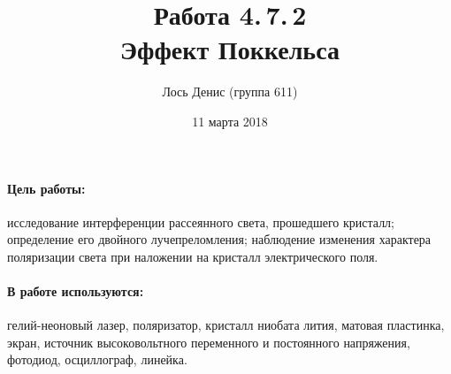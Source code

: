 \documentclass[12pt]{article}
\title{{\bf Работа 4.\,7.\,2 \\ Эффект Поккельса}}
\author{Лось Денис (группа 611)}
\date{11 марта 2018}
\begin{document}
\maketitle

\paragraph{Цель работы: } исследование интерференции рассеянного света, прошедшего кристалл; определение его двойного лучепреломления; наблюдение изменения характера поляризации света при наложении на кристалл электрического поля.

\paragraph{В работе используются: } гелий-неоновый лазер, поляризатор, кристалл ниобата лития, матовая пластинка, экран, источник высоковольтного переменного и постоянного напряжения, фотодиод, осциллограф, линейка.
\end{document}
